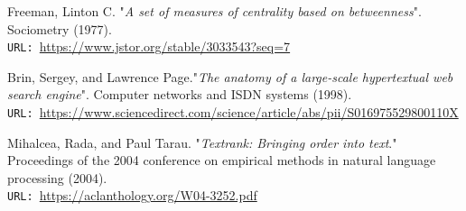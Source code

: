 \documentclass[12pt]{article}
\numberwithin{equation}{section}
\begin{document}
\begin{spacing}{1.5}
\begin{thebibliography}{8}
		Freeman, Linton C. "\textit{A set of measures of centrality based on betweenness}". Sociometry (1977). \\
		\texttt{URL: }\url{https://www.jstor.org/stable/3033543?seq=7}
		
		Brin, Sergey, and Lawrence Page."\textit{The anatomy of a large-scale hypertextual web search engine}". Computer networks and ISDN systems (1998). \\
		\texttt{URL: }\url{https://www.sciencedirect.com/science/article/abs/pii/S016975529800110X}
		
		Mihalcea, Rada, and Paul Tarau. "\textit{Textrank: Bringing order into text}." Proceedings of the 2004 conference on empirical methods in natural language processing (2004). \\
		\texttt{URL: }\url{https://aclanthology.org/W04-3252.pdf}
		
		
	\end{thebibliography}

	\end{spacing}
	
\end{document}
